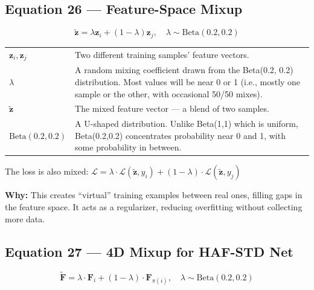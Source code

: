 \documentclass[12pt, a4paper]{article}
\begin{document}
\subsection{Equation 26 --- Feature-Space Mixup}

\begin{eqbox}
\[
\tilde{\mathbf{z}} = \lambda \mathbf{z}_i + (1-\lambda)\mathbf{z}_j, \quad \lambda \sim \text{Beta}(0.2, 0.2)
\]
\end{eqbox}

\begin{explainbox}
\begin{tabular}{lp{11cm}}
$\mathbf{z}_i, \mathbf{z}_j$ & Two different training samples' feature vectors.\\[0.2cm]
$\lambda$ & A random mixing coefficient drawn from the Beta(0.2, 0.2) distribution. Most values will be near 0 or 1 (i.e., mostly one sample or the other, with occasional 50/50 mixes).\\[0.2cm]
$\tilde{\mathbf{z}}$ & The mixed feature vector --- a blend of two samples.\\[0.2cm]
$\text{Beta}(0.2, 0.2)$ & A U-shaped distribution. Unlike Beta(1,1) which is uniform, Beta(0.2,0.2) concentrates probability near 0 and 1, with some probability in between.
\end{tabular}

The loss is also mixed: $\mathcal{L} = \lambda \cdot \mathcal{L}(\tilde{\mathbf{z}}, y_i) + (1-\lambda) \cdot \mathcal{L}(\tilde{\mathbf{z}}, y_j)$

\textbf{Why:} This creates ``virtual'' training examples between real ones, filling gaps in the feature space. It acts as a regularizer, reducing overfitting without collecting more data.
\end{explainbox}


\subsection{Equation 27 --- 4D Mixup for HAF-STD Net}

\begin{eqbox}
\[
\tilde{\mathbf{F}} = \lambda \cdot \mathbf{F}_i + (1 - \lambda) \cdot \mathbf{F}_{\pi(i)}, \quad \lambda \sim \text{Beta}(0.2, 0.2)
\]
\end{eqbox}
\end{document}
